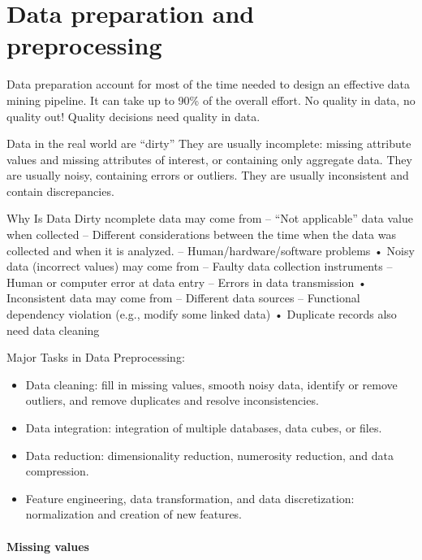 \section{Data preparation and preprocessing}

Data preparation account for most of the time needed to design an effective data mining pipeline. 
It can take up to 90\% of the overall effort.
No quality in data, no quality out!
Quality decisions need quality in data. 

Data in the real world are “dirty”
They are usually incomplete: missing attribute values and missing attributes of interest, or containing only aggregate data.
They are usually noisy, containing errors or outliers.
They are usually inconsistent and contain discrepancies.

Why Is Data Dirty
ncomplete data may come from
– “Not applicable” data value when collected
– Different considerations between the time when the data was collected and when it is analyzed.
– Human/hardware/software problems
• Noisy data (incorrect values) may come from
– Faulty data collection instruments
– Human or computer error at data entry
– Errors in data transmission
• Inconsistent data may come from
– Different data sources
– Functional dependency violation (e.g., modify some linked data)
• Duplicate records also need data cleaning

Major Tasks in Data Preprocessing: 
\begin{itemize}
    \item Data cleaning: fill in missing values, smooth noisy data, identify or remove outliers, and remove duplicates and resolve inconsistencies.
    \item Data integration: integration of multiple databases, data cubes, or files.
    \item Data reduction: dimensionality reduction, numerosity reduction, and data compression.
    \item Feature engineering, data transformation, and data discretization: normalization and creation of new features. 
\end{itemize}

\paragraph*{Missing values}


